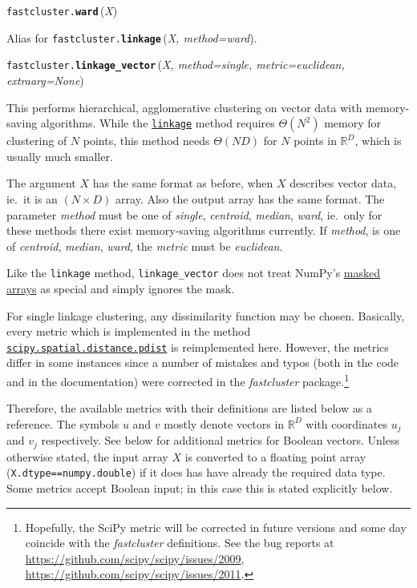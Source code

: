 \documentclass[fontsize=10pt,paper=letter,BCOR=-6mm,DIV=8]{scrartcl}
\makeatletter
\newcommand*\q{\textquotesingle}
\newcommand*\maskedarrays{\href{https://docs.scipy.org/doc/numpy/reference/maskedarray.html}{masked arrays}}
\newcommand*\pdist{\href{https://docs.scipy.org/doc/scipy/reference/generated/scipy.spatial.distance.pdist.html}{\texttt{scipy.spatial.distance.pdist}}}
\newenvironment{methods}{%
  \list{}{\labelwidth\z@
    \itemindent-\leftmargin
    \let\makelabel\methodslabel}%
}{%
  \endlist
}
\newcommand*{\methodslabel}[1]{%
  \hbox to \textwidth{\hspace{\labelsep}%
  \normalfont\bfseries\ttfamily
  #1\hskip-\labelsep\hfill}%
}
\makeatother
\begin{document}
\begin{methods}
\item [\normalfont\texttt{fastcluster.\textbf{ward}}\,(\textit{X})]
\label{ward}
Alias for \texttt{fastcluster.\textbf{linkage}}\,(\textit{X, method=\q ward\q}).

\item [\normalfont\texttt{fastcluster.\textbf{linkage\_vector}}\,(\textit{X, method=\q single\q, metric=\q euclidean\q, extraarg=\q None\q})]
\label{linkage_vector}
This performs hierarchical, agglomerative clustering on vector data with memory-saving algorithms. While the \hyperref[linkage]{\texttt{linkage}} method requires $\Theta(N^2)$ memory for clustering of $N$ points, this method needs $\Theta(ND)$ for $N$ points in $\mathbb R^D$, which is usually much smaller.

The argument $X$ has the same format as before, when $X$ describes vector data, ie.\ it is an $(N\times D)$ array. Also the output array has the same format. The parameter \textit{method} must be one of \textit{\q single\q}, \textit{\q centroid\q}, \textit{\q median\q}, \textit{\q ward\q}, ie.\ only for these methods there exist memory-saving algorithms currently. If \textit{method}, is one of \textit{\q centroid\q}, \textit{\q median\q}, \textit{\q ward\q}, the \textit{metric} must be \textit{\q euclidean\q}.

Like the \texttt{linkage} method, \texttt{linkage\_vector} does not treat NumPy's \maskedarrays{} as special and simply ignores the mask.

For single linkage clustering, any dissimilarity function may be chosen. Basically, every metric which is implemented in the method \pdist{} is reimplemented here. However, the metrics differ in some instances since a number of mistakes and typos (both in the code and in the documentation) were corrected in the \textit{fastcluster} package.\footnote{Hopefully, the SciPy metric will be corrected in future versions and some day coincide with the \textit{fastcluster} definitions. See the bug reports at \url{https://github.com/scipy/scipy/issues/2009}, \url{https://github.com/scipy/scipy/issues/2011}.}

Therefore, the available metrics with their definitions are listed below as a reference. The symbols $u$ and $v$ mostly denote vectors in $\mathbb R^D$ with coordinates $u_j$ and $v_j$ respectively. See below for additional metrics for Boolean vectors. Unless otherwise stated, the input array $X$ is converted to a floating point array (\texttt{X.dtype==\allowbreak numpy.double}) if it does has have already the required data type. Some metrics accept Boolean input; in this case this is stated explicitly below.


\end{methods}
\end{document}
